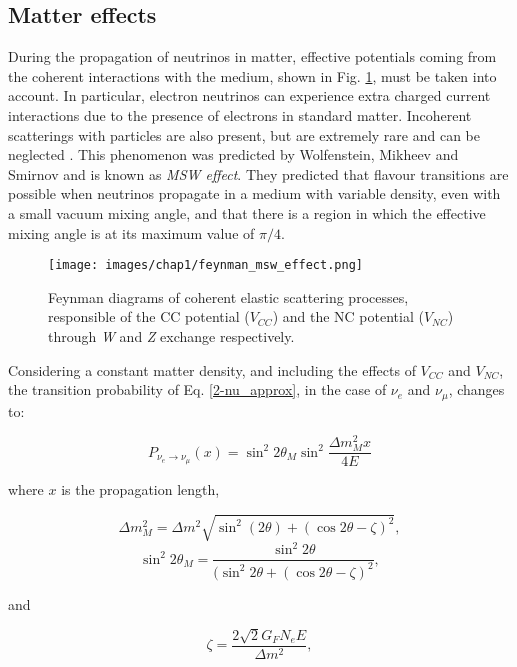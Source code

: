 \subsection{Matter effects}
During the propagation of neutrinos in matter, effective potentials coming from the coherent interactions with the medium, shown in Fig. \ref{fig:feynman-msw-effects}, must be taken into account. In particular, electron neutrinos can experience extra charged current interactions due to the presence of electrons in standard matter. Incoherent scatterings with particles are also present, but are extremely rare and can be neglected \cite{giunti_kim_fundamental}. This phenomenon was predicted by Wolfenstein, Mikheev and Smirnov and is known as \textit{MSW effect}. They predicted that flavour transitions are possible when neutrinos propagate in a medium with variable density, even with a small vacuum mixing angle, and that there is a region in which the effective mixing angle is at its maximum value of $\pi/4$.

\begin{figure}
    \centering
    \texttt{[image: images/chap1/feynman\_msw\_effect.png]}
    \caption{Feynman diagrams of coherent elastic scattering processes, responsible of the CC potential ($V_{CC}$) and the NC potential ($V_{NC}$) through \textit{W} and \textit{Z} exchange respectively.}
    \label{fig:feynman-msw-effects}
\end{figure}

Considering a constant matter density, and including the effects of $V_{CC}$ and $V_{NC}$, the transition probability of Eq. \ref{2-nu_approx}, in the case of $\nu_e$ and $\nu_\mu$, changes to: 

\begin{equation}
\label{2-nu_approx_msw_eq}
    P_{\nu_{e} \rightarrow \nu_{\mu}}(x) = \sin^2{2\theta_{M}}\sin^2{\frac{\Delta m^2_{M} x}{4E}}
\end{equation}

where $x$ is the propagation length,

\begin{equation}
    \Delta m^2_M = \Delta m^2 \sqrt{\sin^2(2\theta)+(\cos 2\theta - \zeta)^2},
\end{equation}
\begin{equation}
\label{sin_msw}
    \sin^2 2\theta_M = \frac{\sin^2 2\theta}{(\sin^2 2\theta + (\cos 2\theta - \zeta)^2},
\end{equation}

and 

\begin{equation}
    \zeta = \frac{2\sqrt{2}G_F N_e E}{\Delta m^2},
\end{equation}

